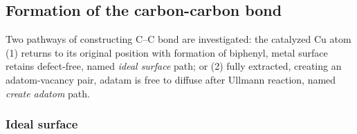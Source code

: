 \documentclass[%
 reprint,
 amsmath,amssymb,
 aps,
prb,
floatfix,
]{revtex4-2}
\newcommand{\lock}{\color{red}}
\newcommand{\zhzh}{\color{blue}}
\newcommand{\lock}{\color{black}}
\newcommand{\zhzh}{\color{black}}
\newcommand{\comm}{\color{Purple}} %
\begin{document}

\subsection{Formation of the carbon-carbon bond}


{\zhzh
Two pathways of constructing C--C bond are investigated: the catalyzed Cu atom (1) returns to its original position with formation of biphenyl, metal surface retains defect-free, named \textit{ideal surface} path; or (2) fully extracted, creating an adatom-vacancy pair, adatam is free to diffuse after Ullmann reaction, named \textit{create adatom} path. 
}

\subsubsection{Ideal surface}



\end{document}
